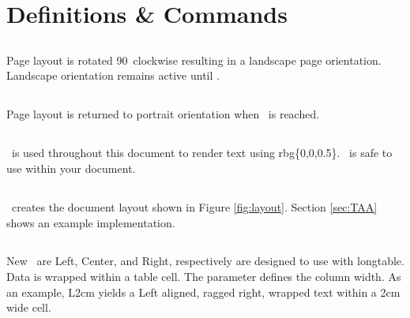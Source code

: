 \documentclass[12pt]{tlc-article}
\begin{document}

\clearpage
\section{Definitions \& Commands}


\subsection{\tlcBL}
Page layout is rotated 90\textdegree\ clockwise resulting in a landscape page
orientation.  Landscape orientation remains active until \tlcEL.


\subsection{\tlcEL}
Page layout is returned to portrait orientation when \tlcEL\ is reached.


\subsection{\tlcDB}
\tlcDB\ is used throughout this document to render text using rbg\{0,0,0.5\}.
\tlcDB\ is safe to use within your document.


\subsection{\tlcTOC}
\tlcTOC\ creates the document layout shown in Figure \ref{fig:layout}.  Section
\ref{sec:TAA} shows an example implementation.


\subsection{\tlcNCT}
New \tlcNCT\ are Left, Center, and Right, respectively are
designed to use with longtable.  Data is wrapped within a table cell.   The
parameter defines the column width.  As an example, L{2cm} yields a Left
aligned, ragged right, wrapped text within a 2cm wide cell.
\end{document}

